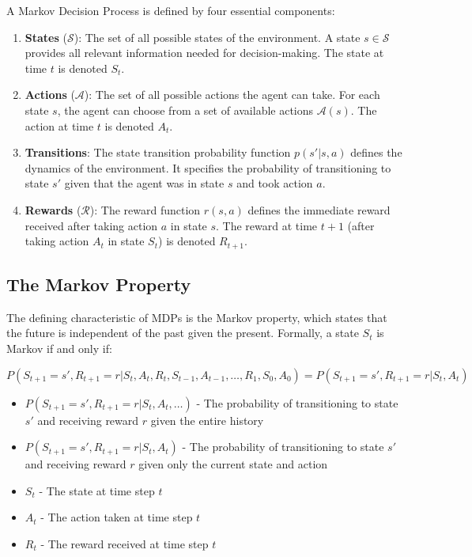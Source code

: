 \documentclass[12pt,a4paper]{article}
\begin{document}
A Markov Decision Process is defined by four essential components:

\begin{enumerate}
    \item \textbf{States} ($\mathcal{S}$): The set of all possible states of the environment. A state $s \in \mathcal{S}$ provides all relevant information needed for decision-making. The state at time $t$ is denoted $S_t$.
    
    \item \textbf{Actions} ($\mathcal{A}$): The set of all possible actions the agent can take. For each state $s$, the agent can choose from a set of available actions $\mathcal{A}(s)$. The action at time $t$ is denoted $A_t$.
    
    \item \textbf{Transitions}: The state transition probability function $p(s'|s,a)$ defines the dynamics of the environment. It specifies the probability of transitioning to state $s'$ given that the agent was in state $s$ and took action $a$.
    
    \item \textbf{Rewards} ($\mathcal{R}$): The reward function $r(s,a)$ defines the immediate reward received after taking action $a$ in state $s$. The reward at time $t+1$ (after taking action $A_t$ in state $S_t$) is denoted $R_{t+1}$.
\end{enumerate}

\subsection{The Markov Property}

The defining characteristic of MDPs is the Markov property, which states that the future is independent of the past given the present. Formally, a state $S_t$ is Markov if and only if:

\begin{equation}
P(S_{t+1}=s', R_{t+1}=r | S_t, A_t, R_t, S_{t-1}, A_{t-1}, \ldots, R_1, S_0, A_0) = P(S_{t+1}=s', R_{t+1}=r | S_t, A_t)
\end{equation}

\begin{tcolorbox}[title=Notation Overview]
\begin{itemize}
    \item $P(S_{t+1}=s', R_{t+1}=r | S_t, A_t, \ldots)$ - The probability of transitioning to state $s'$ and receiving reward $r$ given the entire history
    \item $P(S_{t+1}=s', R_{t+1}=r | S_t, A_t)$ - The probability of transitioning to state $s'$ and receiving reward $r$ given only the current state and action
    \item $S_t$ - The state at time step $t$
    \item $A_t$ - The action taken at time step $t$
    \item $R_t$ - The reward received at time step $t$
\end{itemize}
\end{tcolorbox}
\end{document}
